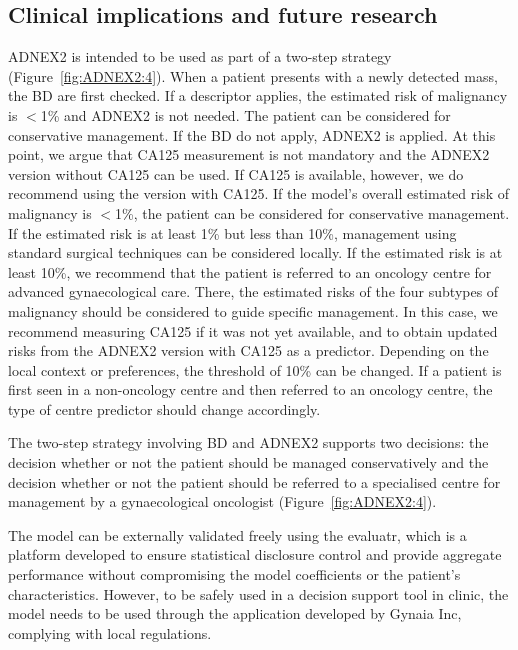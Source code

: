 \subsection{Clinical implications and future research}

ADNEX2 is intended to be used as part of a two-step strategy (Figure~\ref{fig:ADNEX2:4}). When a patient presents with a newly detected mass, the \gls{BD} are first checked. If a descriptor applies, the estimated risk of malignancy is $<$1\% and ADNEX2 is not needed. The patient can be considered for conservative management. If the \gls{BD} do not apply, ADNEX2 is applied. At this point, we argue that \gls{CA125} measurement is not mandatory and the ADNEX2 version without \gls{CA125} can be used. If \gls{CA125} is available, however, we do recommend using the version with \gls{CA125}. If the model's overall estimated risk of malignancy is $<$1\%, the patient can be considered for conservative management. If the estimated risk is at least 1\% but less than 10\%, management using standard surgical techniques can be considered locally. If the estimated risk is at least 10\%, we recommend that the patient is referred to an oncology centre for advanced gynaecological care. There, the estimated risks of the four subtypes of malignancy should be considered to guide specific management. In this case, we recommend measuring \gls{CA125} if it was not yet available, and to obtain updated risks from the ADNEX2 version with \gls{CA125} as a predictor. Depending on the local context or preferences, the threshold of 10\% can be changed. If a patient is first seen in a non-oncology centre and then referred to an oncology centre, the type of centre predictor should change accordingly.

The two-step strategy involving \gls{BD} and ADNEX2 supports two decisions: the decision whether or not the patient should be managed conservatively and the decision whether or not the patient should be referred to a specialised centre for management by a gynaecological oncologist (Figure~\ref{fig:ADNEX2:4}).

The model can be externally validated freely using the evaluatr, which is a platform developed to ensure statistical disclosure control and provide aggregate performance without compromising the model coefficients or the patient's characteristics. However, to be safely used in a decision support tool in clinic, the model needs to be used through the application developed by Gynaia Inc, complying with local regulations.

